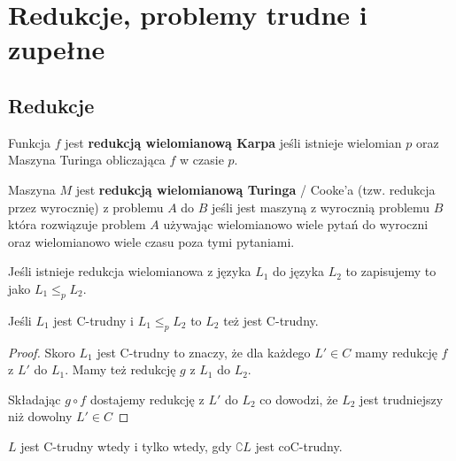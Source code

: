 \section{Redukcje, problemy trudne i zupełne}
\subsection{Redukcje}

\begin{definition}
	Funkcja \( f \) jest \textbf{redukcją wielomianową Karpa} jeśli istnieje wielomian \( p \) oraz Maszyna Turinga obliczająca \( f \) w czasie \( p \).
\end{definition}

\begin{definition}
	Maszyna \( M \) jest \textbf{redukcją wielomianową Turinga} / Cooke'a (tzw. redukcja przez wyrocznię) z problemu \(A\) do \(B\) jeśli jest maszyną z wyrocznią problemu \(B\) która rozwiązuje problem
	\(A\) używając wielomianowo wiele pytań do wyroczni oraz wielomianowo wiele czasu poza tymi pytaniami.
\end{definition}

\begin{definition}
	Jeśli istnieje redukcja wielomianowa z języka \( L_1 \) do języka \( L_2 \) to zapisujemy to jako \( L_1 \leq_p L_2 \).
\end{definition}

\begin{lemma}
	Jeśli \( L_1 \) jest C-trudny i \( L_1 \leq_p L_2 \) to \( L_2 \) też jest C-trudny.
\end{lemma}

\begin{proof}
	Skoro \( L_1 \) jest C-trudny to znaczy, że dla każdego \( L' \in C \) mamy redukcję \( f \) z \( L' \) do \( L_1 \).
	Mamy też redukcję \( g \) z \( L_1 \) do \( L_2 \).

	Składając \( g \circ f \) dostajemy redukcję z \( L' \)  do \( L_2 \) co dowodzi, że \( L_2 \) jest trudniejszy niż dowolny \( L' \in C \)
\end{proof}

\begin{lemma}
	\( L \) jest C-trudny wtedy i tylko wtedy, gdy \( \complement{L} \) jest  coC-trudny.
\end{lemma}

